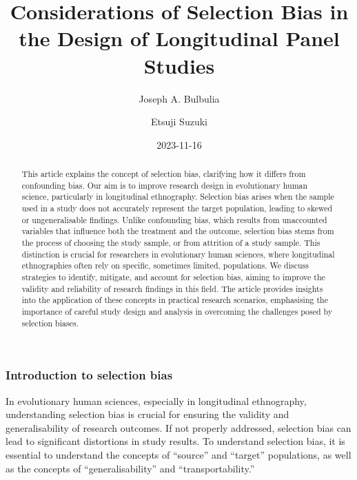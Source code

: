 \documentclass[
  singlecolumn,
  9pt]{article}
\title{Considerations of Selection Bias in the Design of Longitudinal
Panel Studies}
\author{Joseph A. Bulbulia}
\affil{%
                  Victoria University of Wellington, New Zealand
              }
\author{Etsuji Suzuki}
\date{2023-11-16}
\begin{document}
\maketitle
\begin{abstract}
This article explains the concept of selection bias, clarifying how it
differs from confounding bias. Our aim is to improve research design in
evolutionary human science, particularly in longitudinal ethnography.
Selection bias arises when the sample used in a study does not
accurately represent the target population, leading to skewed or
ungeneralisable findings. Unlike confounding bias, which results from
unaccounted variables that influence both the treatment and the outcome,
selection bias stems from the process of choosing the study sample, or
from attrition of a study sample. This distinction is crucial for
researchers in evolutionary human sciences, where longitudinal
ethnographies often rely on specific, sometimes limited, populations. We
discuss strategies to identify, mitigate, and account for selection
bias, aiming to improve the validity and reliability of research
findings in this field. The article provides insights into the
application of these concepts in practical research scenarios,
emphasising the importance of careful study design and analysis in
overcoming the challenges posed by selection biases.
\end{abstract}
\subsubsection{Introduction to selection
bias}\label{introduction-to-selection-bias}

In evolutionary human sciences, especially in longitudinal ethnography,
understanding selection bias is crucial for ensuring the validity and
generalisability of research outcomes. If not properly addressed,
selection bias can lead to significant distortions in study results. To
understand selection bias, it is essential to understand the concepts of
``source'' and ``target'' populations, as well as the concepts of
``generalisability'' and ``transportability.''
\end{document}

